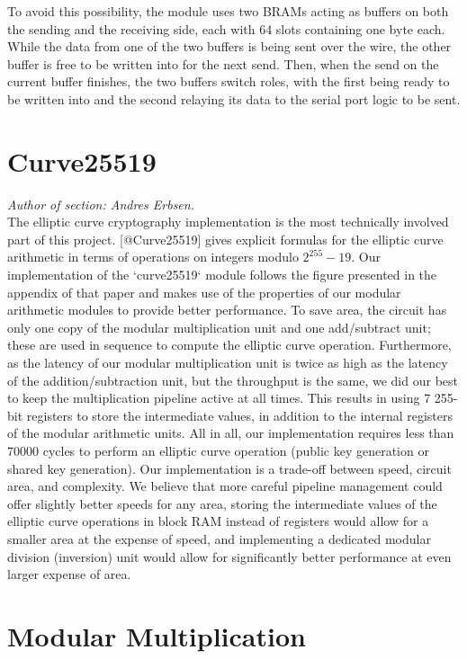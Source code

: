 \documentclass[a4paper]{report}
\begin{document}
To avoid this possibility, the module uses two BRAMs acting as buffers on both the sending and the receiving side, each with 64 slots containing one byte each. While the data from one of the two buffers is being sent over the wire, the other buffer is free to be written into for the next send. Then, when the send on the current buffer finishes, the two buffers switch roles, with the first being ready to be written into and the second relaying its data to the serial port logic to be sent.

\section{Curve25519}

\emph{Author of section: Andres Erbsen.} \\

The elliptic curve cryptography implementation is the most technically involved
part of this project. [@Curve25519] gives explicit formulas for the elliptic
curve arithmetic in terms of operations on integers modulo $2^{255} - 19$. Our
implementation of the `curve25519` module follows the figure presented in the
appendix of that paper and makes use of the properties of our modular arithmetic
modules to provide better performance. To save area, the circuit has only one
copy of the modular multiplication unit and one add/subtract unit; these are
used in sequence to compute the elliptic curve operation. Furthermore, as the
latency of our modular multiplication unit is twice as high as the latency of
the addition/subtraction unit, but the throughput is the same, we did our best
to keep the multiplication pipeline active at all times. This results in using 7
255-bit registers to store the intermediate values, in addition to the internal
registers of the modular arithmetic units. All in all, our implementation
requires less than 70000 cycles to perform an elliptic curve operation (public
key generation or shared key generation). Our implementation is a trade-off
between speed, circuit area, and complexity. We believe that more careful
pipeline management could offer slightly better speeds for any area, storing the
intermediate values of the elliptic curve operations in block RAM instead of
registers would allow for a smaller area at the expense of speed, and
implementing a dedicated modular division (inversion) unit would allow for
significantly better performance at even larger expense of area.

\section{Modular Multiplication}
\end{document}
